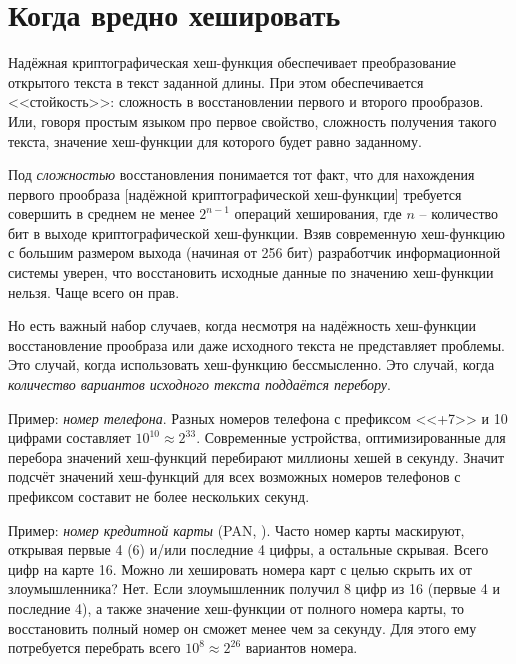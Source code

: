 \section{Когда вредно хешировать}\label{section-when_not_to_hash}

Надёжная криптографическая хеш-функция обеспечивает преобразование открытого текста в текст заданной длины. При этом обеспечивается <<стойкость>>: сложность в восстановлении первого и второго прообразов. Или, говоря простым языком про первое свойство, сложность получения такого текста, значение хеш-функции для которого будет равно заданному.

Под \emph{сложностью} восстановления понимается тот факт, что для нахождения первого прообраза [надёжной криптографической хеш-функции] требуется совершить в среднем не менее $2^{n-1}$ операций хеширования, где $n$ -- количество бит в выходе криптографической хеш-функции. Взяв современную хеш-функцию с большим размером выхода (начиная от 256 бит) разработчик информационной системы уверен, что восстановить исходные данные по значению хеш-функции нельзя. Чаще всего он прав.

Но есть важный набор случаев, когда несмотря на надёжность хеш-функции восстановление прообраза или даже исходного текста не представляет проблемы. Это случай, когда использовать хеш-функцию бессмысленно. Это случай, когда \emph{количество вариантов исходного текста поддаётся перебору}.

Пример: \emph{номер телефона}. Разных номеров телефона с префиксом <<+7>> и 10 цифрами составляет $10^{10} \approx 2^{33}$. Современные устройства, оптимизированные для перебора значений хеш-функций перебирают миллионы хешей в секунду. Значит подсчёт значений хеш-функций для всех возможных номеров телефонов с префиксом составит не более нескольких секунд.

Пример: \emph{номер кредитной карты} (PAN, ). Часто номер карты маскируют, открывая первые 4 (6) и/или последние 4 цифры, а остальные скрывая. Всего цифр на карте 16. Можно ли хешировать номера карт с целью скрыть их от злоумышленника? Нет. Если злоумышленник получил 8 цифр из 16 (первые 4 и последние 4), а также значение хеш-функции от полного номера карты, то восстановить полный номер он сможет менее чем за секунду. Для этого ему потребуется перебрать всего $10^{8} \approx 2^{26}$ вариантов номера.

